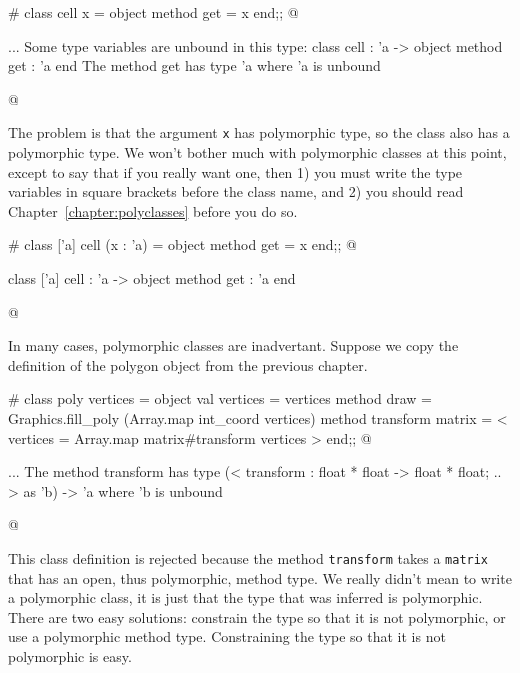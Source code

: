 \begin{ocaml}
# class cell x =
  object
     method get = x
  end;;
@
\begin{topoutput}
...
Some type variables are unbound in this type:
  class cell : 'a -> object method get : 'a end
The method get has type 'a where 'a is unbound
\end{topoutput}
@
\end{ocaml}
%
The problem is that the argument \hbox{\lstinline/x/} has polymorphic type, so the class also has a
polymorphic type.  We won't bother much with polymorphic classes at this point, except to say that
if you really want one, then 1) you must write the type variables in square brackets before the
class name, and 2) you should read Chapter~\ref{chapter:polyclasses} before you do so.

\begin{ocaml}
# class ['a] cell (x : 'a) =
  object
     method get = x
  end;;
@
\begin{topoutput}
class ['a] cell : 'a -> object method get : 'a end
\end{topoutput}
@
\end{ocaml}
%
In many cases, polymorphic classes are inadvertant.  Suppose we copy the definition of the
polygon object from the previous chapter.

\begin{ocaml}
# class poly vertices =
object
   val vertices = vertices
   method draw = Graphics.fill_poly (Array.map int_coord vertices)
   method transform matrix = {< vertices = Array.map matrix#transform vertices >}
end;;
@
\begin{topoutput}
...
The method transform has type
  (< transform : float * float -> float * float; .. > as 'b) -> 'a
where 'b is unbound
\end{topoutput}
@
\end{ocaml}
%
This class definition is rejected because the method \hbox{\lstinline/transform/} takes
a \hbox{\lstinline/matrix/} that has an open, thus polymorphic, method type.  We really didn't mean to write
a polymorphic class, it is just that the type that was inferred is polymorphic.  There are two easy
solutions: constrain the type so that it is not polymorphic, or use a polymorphic method type.
Constraining the type so that it is not polymorphic is easy.

